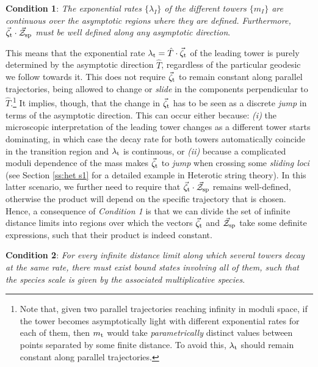 \begin{center}
	\textbf{Condition 1}: \textit{The exponential rates $\{\lambda_I\}$ of the different towers $\{m_I\}$ are continuous over the asymptotic regions where they are defined. Furthermore, $\vec{\zeta}_{\rm t}\cdot\vec{\mathcal{Z}}_{\rm sp}$ must be well defined along any asymptotic direction}. 
\end{center}	
	
	
This means that the exponential rate $\lambda_{\rm t}=\hat{T}\cdot\vec{\zeta}_{\rm t}$ of the leading tower is purely determined by the asymptotic direction $\hat{T}$, regardless of the particular geodesic we follow towards it. This does not require $\vec{\zeta}_{\rm t}$ to remain constant along parallel trajectories, being allowed to change or \emph{slide} in the components perpendicular to $\hat{T}$.\footnote{Note that, given two parallel trajectories reaching infinity in moduli space, if the tower becomes asymptotically light with different exponential rates for each of them, then $m_{\rm t}$ would take \emph{parametrically} distinct values between points separated by some finite distance. To avoid this, $\lambda_{\rm t}$ should remain constant along parallel trajectories.} It implies, though, that the change in $\vec{\zeta}_{\rm t}$ has to be seen as a discrete \emph{jump} in terms of the asymptotic direction. This can occur either because: \emph{(i)} the microscopic interpretation of the leading tower changes as a different tower starts dominating, in which case the decay rate for both towers automatically coincide in the transition region and $\lambda_{\rm t}$ is continuous, or \emph{(ii)} because a complicated moduli dependence of the mass makes $\vec{\zeta}_{\rm t}$ to \emph{jump} when crossing some \emph{sliding loci}  (see Section \ref{ss:het s1} for a detailed example in Heterotic string theory). In this latter scenario, we further need to require that $\vec{\zeta}_{\rm t}\cdot\vec{\mathcal{Z}}_{\rm sp}$ remains well-defined, otherwise the product will depend on the specific trajectory that is chosen. Hence, a consequence of \emph{Condition 1} is that we can divide the set of infinite distance limits into regions over which the vectors $\vec{\zeta}_{\rm t}$ and $\vec{\mathcal{Z}}_{\rm sp}$ take some definite expressions, such that their product is indeed constant. 

\begin{center}
	\textbf{Condition 2}: \textit{For every infinite distance limit along which several towers decay at the same rate, there must exist bound states involving all of them, such that the species scale is given by the associated multiplicative species}. 
\end{center}


